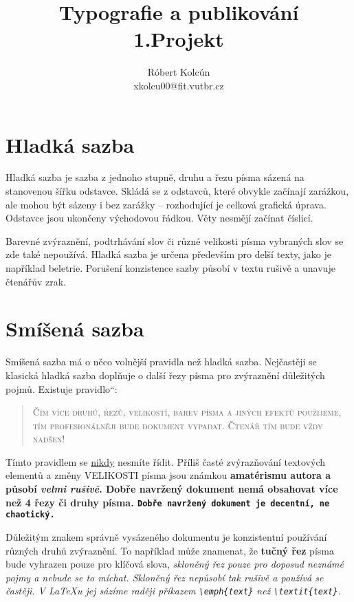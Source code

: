 \documentclass[11pt,a4paper,twocolumn]{article}
\author{Róbert Kolcún \\ xkolcu00@fit.vutbr.cz}
\title{Typografie a publikování \\ 1.Projekt}
\date{}
\newcommand{\myuv}[1]{\quotedblbase #1\textquotedblleft}
\begin{document}
	\maketitle
	
	\section{Hladká sazba}
	
	Hladká sazba je sazba z jednoho stupně, druhu a řezu písma sázená na stanovenou šířku odstavce. Skládá se z odstavců, které obvykle začínají zarážkou, ale mohou být sázeny i bez zarážky -- rozhodující je celková grafická úprava. Odstavce jsou ukončeny východovou řádkou. Věty nesmějí začínat číslicí.
	
	Barevné zvýraznění, podtrhávání slov či různé velikosti písma vybraných slov se zde také nepoužívá. Hladká sazba je určena především pro delší texty, jako je například beletrie. Porušení konzistence sazby působí v textu rušivě a unavuje čtenářův zrak.
	
	\section{Smíšená sazba}
	
	Smíšená sazba má o něco volnější pravidla než hladká sazba. Nejčastěji se klasická hladká sazba doplňuje o další řezy písma pro zvýraznění důležitých pojmů. Existuje \myuv{pravidlo}:
	
	
	\begin{quotation}
		\textsc{Čím více druhů, řezů, velikostí, barev písma a jiných efektů použije\-me, tím profesionálněji bude dokument vypadat. Čtenář tím bude vždy nadšen!}
	\end{quotation}
	
	Tímto pravidlem se \underline{nikdy} nesmíte řídit. Příliš časté zvýrazňování textových elementů a změny \huge{V}\LARGE{E}\Large{L}\large{I}\normalsize{K}\small{O}\footnotesize{S}\scriptsize{T}\tiny{I} \normalsize písma \Large{jsou} \LARGE{známkou} \bfseries{\huge{ama\-térismu}} \normalsize\normalfont autora a působí \textbf{\textit{velmi}} \textit{rušivě}. Dobře navržený dokument nemá obsahovat více než 4 řezy či druhy písma. \texttt{Dobře navržený dokument je decentní, ne chaotický.}
	
	Důležitým znakem správně vysázeného dokumentu je konzistentní používání různých druhů zvýraznění. To například může znamenat, že \textbf{tučný řez} písma bude vyhrazen pouze pro klíčová slova, \itshape skloněný řez \normalfont pouze pro doposud neznámé pojmy a nebude se to míchat. Skloněný řez nepůsobí tak rušivě a používá se častěji. V \LaTeX u jej sázíme raději příkazem \verb+\emph{text}+ než  \verb+\textit{text}+.
	
\end{document}
